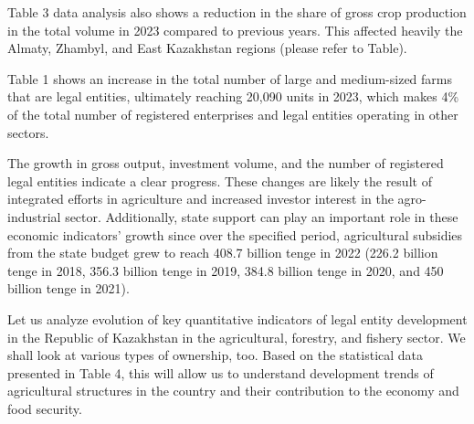 \begin{multicols}{2}


Table 3 data analysis also shows a reduction in the share of gross crop
production in the total volume in 2023 compared to previous years. This
affected heavily the Almaty, Zhambyl, and East Kazakhstan regions
(please refer to Table).

Table 1 shows an increase in the total number of large and medium-sized
farms that are legal entities, ultimately reaching 20,090 units in 2023,
which makes 4\% of the total number of registered enterprises and legal
entities operating in other sectors.

The growth in gross output, investment volume, and the number of
registered legal entities indicate a clear progress. These changes are
likely the result of integrated efforts in agriculture and increased
investor interest in the agro-industrial sector. Additionally, state
support can play an important role in these economic indicators' growth
since over the specified period, agricultural subsidies from the state
budget grew to reach 408.7 billion tenge in 2022 (226.2 billion tenge in
2018, 356.3 billion tenge in 2019, 384.8 billion tenge in 2020, and 450
billion tenge in 2021).

Let us analyze evolution of key quantitative indicators of legal entity
development in the Republic of Kazakhstan in the agricultural, forestry,
and fishery sector. We shall look at various types of ownership, too.
Based on the statistical data presented in Table 4, this will allow us
to understand development trends of agricultural structures in the
country and their contribution to the economy and food security.
\end{multicols}

